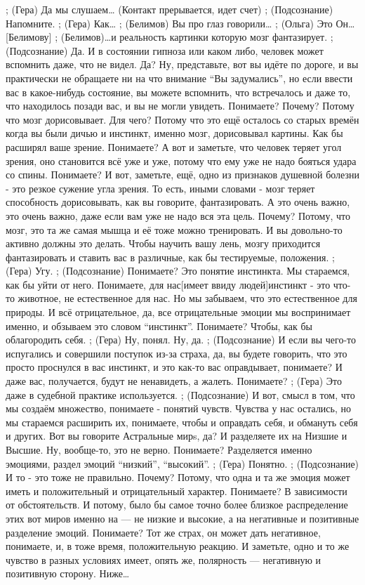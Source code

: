 ;	(Гера) Да мы слушаем…
(Контакт прерывается, идет счет)
;	(Подсознание) Напомните.
;	(Гера) Как…
;	(Белимов) Вы про глаз говорили…
;	(Ольга) Это Он…[Белимову]
;	(Белимов)…и реальность картинки которую мозг фантазирует.
;	(Подсознание) Да. И в состоянии гипноза или каком либо, человек может вспомнить даже, что не видел. Да? Ну, представьте, вот вы идёте по дороге, и вы практически не обращаете ни на что внимание ``Вы задумались'', но если ввести вас в какое-нибудь состояние, вы можете вспомнить, что встречалось и даже то, что находилось позади вас, и вы не могли увидеть. Понимаете? Почему? Потому что мозг дорисовывает. Для чего? Потому что это ещё осталось со старых времён когда вы были дичью и инстинкт, именно мозг, дорисовывал картины. Как бы расширял ваше зрение. Понимаете? А вот и заметьте, что человек теряет угол зрения, оно становится всё уже и уже, потому что ему уже не надо бояться удара со спины. Понимаете? И вот, заметьте, ещё, одно из признаков душевной болезни - это резкое сужение угла зрения. То есть,  иными словами - мозг теряет способность дорисовывать, как вы говорите, фантазировать. А это очень важно, это очень важно, даже если вам уже не надо вся эта цель. Почему? Потому, что мозг, это та же самая мышца и её тоже можно тренировать. И вы довольно-то активно должны это делать. Чтобы научить вашу лень, мозгу приходится фантазировать и ставить вас в различные, как бы тестируемые, положения. 
;	(Гера) Угу.
;	(Подсознание) Понимаете? Это понятие инстинкта. Мы стараемся, как бы уйти от него. Понимаете, для нас[имеет ввиду людей]инстинкт - это что-то животное, не естественное для нас. Но мы забываем, что это естественное для природы. И всё отрицательное, да, все отрицательные эмоции мы воспринимает именно, и обзываем это словом ``инстинкт''. Понимаете? Чтобы, как бы облагородить себя. 
;	(Гера) Ну, понял. Ну, да.
;	(Подсознание) И если вы чего-то испугались и совершили поступок из-за страха, да, вы будете говорить, что это просто проснулся в вас инстинкт, и это как-то вас оправдывает, понимаете? И даже вас, получается, будут не ненавидеть, а жалеть. Понимаете? 
;	(Гера) Это даже в судебной практике используется.
;	(Подсознание) И вот, смысл в том, что мы создаём множество, понимаете - понятий чувств. Чувства у нас остались, но мы стараемся расширить их, понимаете,  чтобы и оправдать себя, и обмануть себя и других. Вот вы говорите Астральные мирs, да? И разделяете их на Низшие и Высшие. Ну, вообще-то, это не верно. Понимаете? Разделяется именно эмоциями, раздел эмоций ``низкий'', ``высокий''.
;	(Гера) Понятно.
;	(Подсознание) И то - это тоже не правильно. Почему? Потому, что одна и та же эмоция может иметь и положительный и отрицательный характер. Понимаете? В зависимости от обстоятельств. И потому, было бы самое точно более близкое распределение этих вот миров именно на — не низкие и высокие, а на негативные и позитивные разделение эмоций. Понимаете? Тот же страх, он может дать негативное, понимаете, и, в тоже время, положительную реакцию. И заметьте, одно и то же чувство в разных условиях имеет, опять же, полярность — негативную и позитивную сторону. Ниже…
